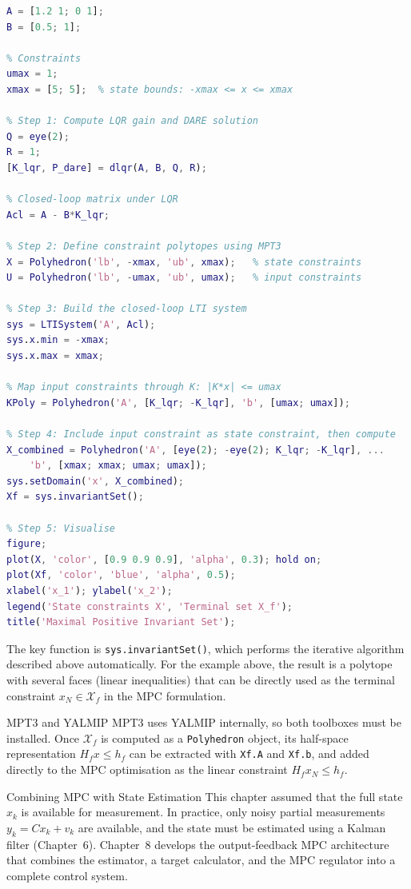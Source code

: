 \begin{lstlisting}[language=Matlab, caption={Computing $\mathcal{X}_f$ using MPT3}]
% System matrices
A = [1.2 1; 0 1];
B = [0.5; 1];

% Constraints
umax = 1;
xmax = [5; 5];  % state bounds: -xmax <= x <= xmax

% Step 1: Compute LQR gain and DARE solution
Q = eye(2);
R = 1;
[K_lqr, P_dare] = dlqr(A, B, Q, R);

% Closed-loop matrix under LQR
Acl = A - B*K_lqr;

% Step 2: Define constraint polytopes using MPT3
X = Polyhedron('lb', -xmax, 'ub', xmax);   % state constraints
U = Polyhedron('lb', -umax, 'ub', umax);   % input constraints

% Step 3: Build the closed-loop LTI system
sys = LTISystem('A', Acl);
sys.x.min = -xmax;
sys.x.max = xmax;

% Map input constraints through K: |K*x| <= umax
KPoly = Polyhedron('A', [K_lqr; -K_lqr], 'b', [umax; umax]);

% Step 4: Include input constraint as state constraint, then compute
X_combined = Polyhedron('A', [eye(2); -eye(2); K_lqr; -K_lqr], ...
    'b', [xmax; xmax; umax; umax]);
sys.setDomain('x', X_combined);
Xf = sys.invariantSet();

% Step 5: Visualise
figure;
plot(X, 'color', [0.9 0.9 0.9], 'alpha', 0.3); hold on;
plot(Xf, 'color', 'blue', 'alpha', 0.5);
xlabel('x_1'); ylabel('x_2');
legend('State constraints X', 'Terminal set X_f');
title('Maximal Positive Invariant Set');
\end{lstlisting}

The key function is \texttt{sys.invariantSet()}, which performs the iterative algorithm described above automatically. For the example above, the result is a polytope with several faces (linear inequalities) that can be directly used as the terminal constraint $x_N \in \mathcal{X}_f$ in the MPC formulation.

\begin{notebox}{MPT3 and YALMIP}
	MPT3 uses YALMIP internally, so both toolboxes must be installed. Once $\mathcal{X}_f$ is computed as a \texttt{Polyhedron} object, its half-space representation $H_f x \le h_f$ can be extracted with \texttt{Xf.A} and \texttt{Xf.b}, and added directly to the MPC optimisation as the linear constraint $H_f x_N \le h_f$.
\end{notebox}

\begin{notebox}{Combining MPC with State Estimation}
This chapter assumed that the full state $x_k$ is available for measurement. In practice, only noisy partial measurements $y_k = Cx_k + v_k$ are available, and the state must be estimated using a Kalman filter (Chapter~6). Chapter~8 develops the output-feedback MPC architecture that combines the estimator, a target calculator, and the MPC regulator into a complete control system.
\end{notebox}

